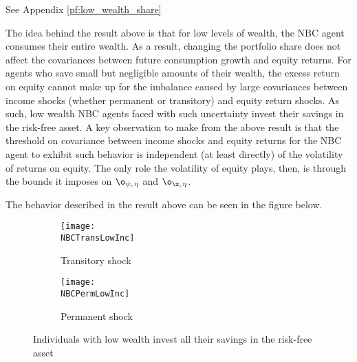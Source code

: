 \pf See Appendix \ref{pf:low_wealth_share}

The idea behind the result above is that for low levels of wealth, the NBC agent consumes their entire wealth. As a result, changing the portfolio share does not affect the covariances between future consumption growth and equity returns. For agents who save small but negligible amounts of their wealth, the excess return on equity cannot make up for the imbalance caused by large covariances between income shocks (whether permanent or transitory) and equity return shocks. As such, low wealth NBC agents faced with such uncertainty invest their savings in the risk-free asset. A key observation to make from the above result is that the threshold on covariance between income shocks and equity returns for the NBC agent to exhibit such behavior is independent (at least directly) of the volatility of returns on equity. The only role the volatility of equity plays, then, is through the bounds it imposes on $\o_{\psi,\,\eta}$ and $\o_{\z,\,\eta}$.

The behavior described in the result above can be seen in the figure below.

\begin{figure}[h]
    \centering
    \begin{subfigure}{0.49\textwidth}
        \centering
        \texttt{[image: \\NBCTransLowInc]}
        \caption{Transitory shock}
        \label{subfig:correlated_poor_transitory}        
    \end{subfigure}
    \begin{subfigure}{0.49\textwidth}
        \centering
        \texttt{[image: \\NBCPermLowInc]}
        \caption{Permanent shock}
        \label{subfig:correlated_poor_permanent}
    \end{subfigure}
    \caption{Individuals with low wealth invest all their savings in the risk-free asset}
    \label{fig:baseline_correlated_poor}
\end{figure}

